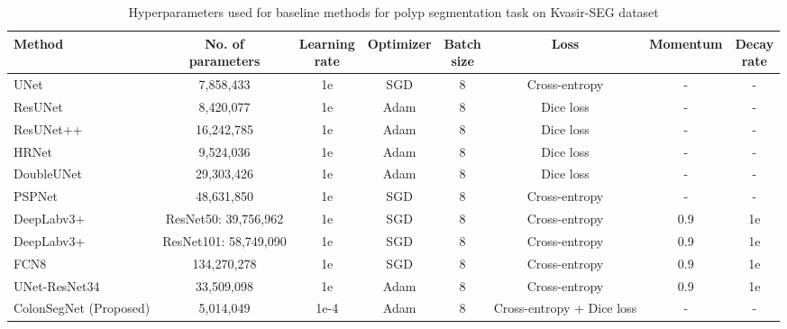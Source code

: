 \documentclass[journal]{IEEEtran}
\begin{document}
\begin{table*}[t!h!]
\centering
\caption{Hyperparameters used for baseline methods for polyp segmentation task on Kvasir-SEG dataset}   
\def\arraystretch{1.2}
\label{table:parametersusedsegmentation}
\begin{tabular}{l|c|c|c|c|c|c|c}
\toprule
\textbf{Method} & \shortstack{\textbf{No. of }\\\textbf{parameters}} &\shortstack{\textbf{Learning}\\ \textbf{rate}} & \textbf{Optimizer} & \shortstack{\textbf{Batch}\\ \textbf{size}} & \textbf{Loss} & \textbf{Momentum} & \shortstack{\textbf{Decay}\\ \textbf{rate}}\\ \midrule

{UNet}~\cite{ronneberger2015u} & 7,858,433   &  1e &  SGD & 8 & Cross-entropy  & - & -\\ \hline 


ResUNet~\cite{zhang2018road} &8,420,077 &1e &Adam &8   &Dice loss   & - &- \\ \hline 


{ResUNet++}~\cite{jha2019resunet++} & 16,242,785 & 1e &  Adam & 8 & Dice loss &- &-\\  \hline 



HRNet~\cite{wang2020deep} &9,524,036   &1e &Adam &8 &Dice loss & -&-\\  \hline 


{DoubleUNet}~\cite{jha2020doubleu} &  29,303,426 &   1e  &   Adam &  8 &  Dice loss &-  &- \\ \hline {PSPNet}~\cite{zhao2017pyramid} & 48,631,850   & 1e  &   SGD & 8 & Cross-entropy &-  & -\\  \hline  

{DeepLabv3+}~\cite{chen2018encoder}  & ResNet50: 39,756,962 & 1e  &   SGD & 8 & Cross-entropy & 0.9 & 1e  \\ \hline
  
{DeepLabv3+}~\cite{chen2018encoder} & ResNet101: 58,749,090 & 1e  &   SGD & 8 & Cross-entropy & 0.9 & 1e  \\  \hline 
  

{FCN8}~\cite{long2015fully}  & 134,270,278  & 1e   & SGD  &  8  & Cross-entropy & 0.9 & 1e \\  \hline
UNet-ResNet34 & 33,509,098   & 1e  & Adam  & 8  & Cross-entropy  &0.9  &1e  
 \\ \hline
 
ColonSegNet (Proposed) &5,014,049  &1e-4  &Adam &8  &Cross-entropy + Dice loss  &- &-  \\

 
 \bottomrule
\end{tabular}
\end{table*}
\end{document}

